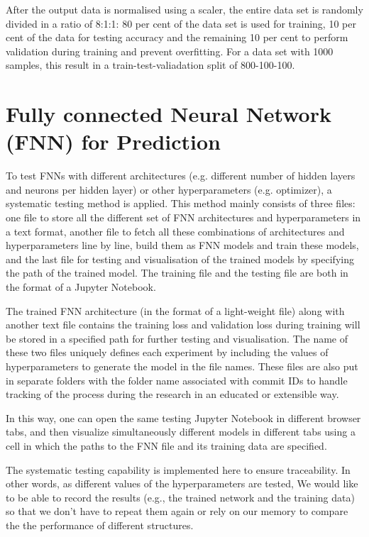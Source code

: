 After the output data is normalised using a scaler, the entire data set is randomly divided in a ratio of 8:1:1: 80 per cent of the data set is used for training, 10 per cent of the data for testing accuracy and the remaining 10 per cent to perform validation during training and prevent overfitting. For a data set with 1000 samples, this result in a train-test-valiadation split of 800-100-100.


\section{Fully connected Neural Network (FNN) for Prediction}

To test FNNs with different architectures (e.g. different number of hidden layers and neurons per hidden layer) or other hyperparameters (e.g. optimizer), a systematic testing method is applied. This method mainly consists of three files: one file to store all the different set of FNN architectures and hyperparameters in a text format, another file to fetch all these combinations of architectures and hyperparameters line by line, build them as FNN models and train these models, and the last file for testing and visualisation of the trained models by specifying the path of the trained model. The training file and the testing file are both in the format of a Jupyter Notebook.

The trained FNN architecture (in the format of a light-weight file) along with another text file contains the training loss and validation loss during training will be stored in a specified path for further testing and visualisation. The name of these two files uniquely defines each experiment by including the values of hyperparameters to generate the model in the file names. These files are also put in separate folders with the folder name associated with commit IDs to handle tracking of the process during the research in an educated or extensible way.

In this way, one can open the same testing Jupyter Notebook in different browser tabs, and then visualize simultaneously different models in different tabs using a cell in which the paths to the FNN file and its training data are specified. 

The systematic testing capability is implemented here to ensure traceability. In other words, as different values of the hyperparameters are tested, We would like to be able to record the results (e.g., the trained network and the training data) so that we don't have to repeat them again or rely on our memory to compare the the performance of different structures.

